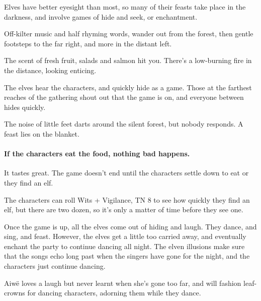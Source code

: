 \begin{multicols}{2}
Elves have better eyesight than most, so many of their feasts take place in the darkness, and involve games of hide and seek, or enchantment.

\begin{boxtext}

  Off-kilter music and half rhyming words, wander out from the forest, then gentle footsteps to the far right, and more in the distant left.

  The scent of fresh fruit, salads and salmon hit you.  There's a low-burning fire in the distance, looking enticing.

\end{boxtext}

The elves hear the characters, and quickly hide as a game.  Those at the farthest reaches of the gathering shout out that the game is on, and everyone between hides quickly.

\begin{boxtext}

  The noise of little feet darts around the silent forest, but nobody responds.
  A feast lies on the blanket.

\end{boxtext}

\paragraph{If the characters eat the food, nothing bad happens.}
It tastes great.
The game doesn't end until the characters settle down to eat or they find an elf.

The characters can roll Wits + Vigilance, TN 8 to see how quickly they find an elf, but there are two dozen, so it's only a matter of time before they see one.

Once the game is up, all the elves come out of hiding and laugh.  They dance, and sing, and feast.  However, the elves get a little too carried away, and eventually enchant the party to continue dancing all night.  The elven illusions make sure that the songs echo long past when the singers have gone for the night, and the characters just continue dancing.
 

Aiw\"{e} loves a laugh but never learnt when she's gone too far, and will fashion leaf-crowns for dancing characters, adorning them while they dance.



\end{multicols}
